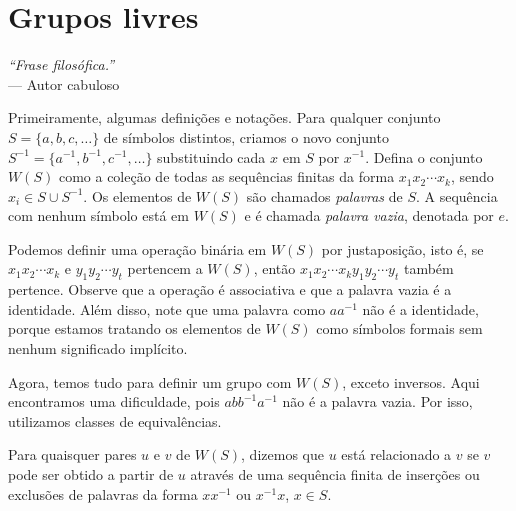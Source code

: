 \chapter[Grupos livres]{Grupos livres}
\label{cap-grupos-livres}
\chaptermark{}
%
\hfill%
\begin{minipage}{10cm}
\begin{flushright}
\rightskip=0.5cm
\textit{``Frase filosófica.''}
\\[0.1cm]
\rightskip=0.5cm
--- Autor cabuloso
\end{flushright}
\end{minipage}

\hspace{21pt} Primeiramente, algumas definições e notações. Para qualquer conjunto $S = \{ a, b, c, \dots \}$ de símbolos distintos, criamos o novo conjunto $S^{-1} = \{ a^{-1}, b^{-1}, c^{-1}, \dots \}$ substituindo cada $x$ em $S$ por $x^{-1}$. Defina o conjunto $W(S)$ como a coleção de todas as sequências finitas da forma $x_1x_2\cdots x_k$, sendo $x_i\in S\cup S^{-1}$. Os elementos de $W(S)$ são chamados \textit{palavras} de $S$. A sequência com nenhum símbolo está em $W(S)$ e é chamada \textit{palavra vazia}, denotada por $e$.
	
	\par\vspace{0.3cm} Podemos definir uma operação binária em $W(S)$ por justaposição, isto é, se $x_1x_2\cdots x_k$ e $y_1y_2\cdots y_t$ pertencem a $W(S)$, então $x_1x_2\cdots x_ky_1y_2\cdots y_t$ também pertence. Observe que a operação é associativa e que a palavra vazia é a identidade. Além disso, note que uma palavra como $aa^{-1}$ não é a identidade, porque estamos tratando os elementos de $W(S)$ como símbolos formais sem nenhum significado implícito.
	
	\par\vspace{0.3cm} Agora, temos tudo para definir um grupo com $W(S)$, exceto inversos. Aqui encontramos uma dificuldade, pois $abb^{-1}a^{-1}$ não é a palavra vazia. Por isso, utilizamos classes de equivalências.
	
	\begin{deff}
		Para quaisquer pares $u$ e $v$ de $W(S)$, dizemos que $u$ está relacionado a $v$ se $v$ pode ser obtido a partir de $u$ através de uma sequência finita de inserções ou exclusões de palavras da forma $xx^{-1}$ ou $x^{-1}x$, $x\in S$.
	\end{deff}
	
